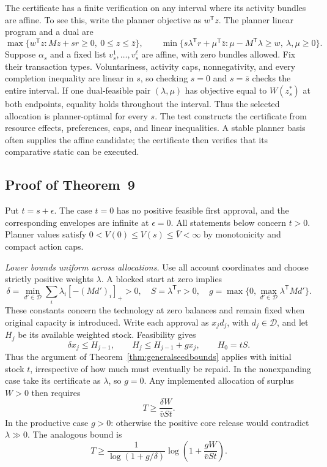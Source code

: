 \documentclass[ecta,draft,supplement]{econsocart}
\theoremstyle{definition}
\theoremstyle{definition}
\begin{document}
\begin{appendix}
The certificate has a finite verification on any interval where its
activity bundles are affine. To see this, write the planner objective
as $w^{\mathsf T}z$. The planner linear program and a dual are
\[
 \max\{w^{\mathsf T}z:Mz+sr\geq0,\ 0\leq z\leq\bar z\},
 \qquad
 \min\{s\lambda^{\mathsf T}r+\mu^{\mathsf T}\bar z:
       \mu-M^{\mathsf T}\lambda\geq w,\ \lambda,\mu\geq0\}.
\]
Suppose $\alpha_s$ and a fixed list $v_s^1,\ldots,v_s^\ell$ are
affine, with zero bundles allowed. Fix their transaction types.
Voluntariness, activity caps, nonnegativity, and every completion
inequality are linear in $s$, so checking $s=0$ and $s=\bar s$
checks the entire interval. If one dual-feasible pair $(\lambda,\mu)$
has objective equal to $W(z_s^*)$ at both endpoints, equality holds
throughout the interval. Thus the selected allocation is planner-optimal
for every $s$. The test constructs the certificate from resource effects, preferences,
caps, and linear inequalities.
A stable planner basis often supplies the affine candidate; the
certificate then verifies that its comparative static can be executed.

\subsection{Proof of Theorem~9%
}

Put $t=s+\epsilon$. The case $t=0$ has no positive feasible first
approval, and the corresponding envelopes are infinite at
$\epsilon=0$. All statements below concern $t>0$. Planner values
satisfy $0<V(0)\leq V(s)\leq\bar V<\infty$ by monotonicity and
compact action caps.

\emph{Lower bounds uniform across allocations.}
Use all account coordinates and choose strictly positive weights
$\lambda$. A blocked start at zero implies
\[
 \delta=\min_{d'\in\mathcal D}
       \sum_i\lambda_i[-(Md')_i]_+>0,
 \quad S=\lambda^{\mathsf T}r>0,
 \quad g=\max\{0,\max_{d'\in\mathcal D}
                       \lambda^{\mathsf T}Md'\}.
\]
These constants concern the technology at zero balances and remain
fixed when original capacity is introduced. Write each approval as
$x_jd_j$, with $d_j\in\mathcal D$, and let $H_j$ be its available
weighted stock. Feasibility gives
\[
 \delta x_j\leq H_{j-1},\qquad
 H_j\leq H_{j-1}+gx_j,\qquad H_0=tS.
\]
Thus the argument of Theorem~\ref{thm:generalseedbounds} applies
with initial stock $t$, irrespective of how much must eventually
be repaid. In the nonexpanding case take its certificate as
$\lambda$, so $g=0$. Any implemented allocation of surplus $W>0$
then requires
\[
 T\geq\frac{\delta W}{\bar v S t}.
\]
In the productive case $g>0$: otherwise the positive core release
would contradict $\lambda\gg0$. The analogous bound is
\[
 T\geq\frac{1}{\log(1+g/\delta)}
       \log\left(1+\frac{gW}{\bar v S t}\right).
\]


\end{appendix}
\end{document}
